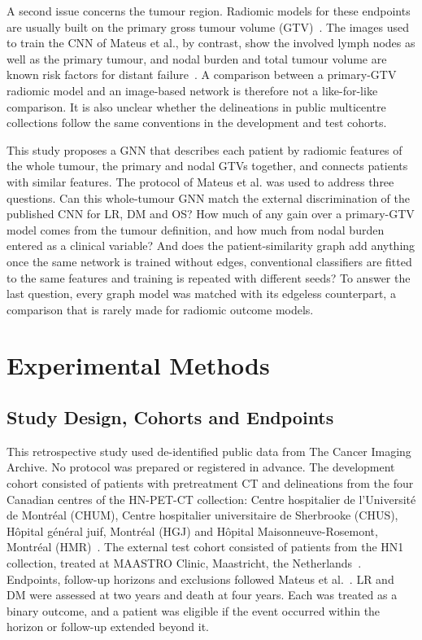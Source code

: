 \documentclass[pdflatex,iicol,sn-nature]{sn-jnl}
\begin{document}
A second issue concerns the tumour region. Radiomic models for these endpoints are usually built on the primary gross tumour volume (GTV)~\cite{aerts2014,vallieres2017}. The images used to train the CNN of Mateus et al., by contrast, show the involved lymph nodes as well as the primary tumour, and nodal burden and total tumour volume are known risk factors for distant failure~\cite{kjems2023volume,jensen2020nodalfdg}. A comparison between a primary-GTV radiomic model and an image-based network is therefore not a like-for-like comparison. It is also unclear whether the delineations in public multicentre collections follow the same conventions in the development and test cohorts.

This study proposes a GNN that describes each patient by radiomic features of the whole tumour, the primary and nodal GTVs together, and connects patients with similar features. The protocol of Mateus et al. was used to address three questions. Can this whole-tumour GNN match the external discrimination of the published CNN for LR, DM and OS? How much of any gain over a primary-GTV model comes from the tumour definition, and how much from nodal burden entered as a clinical variable? And does the patient-similarity graph add anything once the same network is trained without edges, conventional classifiers are fitted to the same features and training is repeated with different seeds? To answer the last question, every graph model was matched with its edgeless counterpart, a comparison that is rarely made for radiomic outcome models.

\section{Experimental Methods}\label{sec:methods}

\subsection{Study Design, Cohorts and Endpoints}\label{sec:design}
This retrospective study used de-identified public data from The Cancer Imaging Archive. No protocol was prepared or registered in advance. The development cohort consisted of \nPatCan{} patients with pretreatment CT and delineations from the four Canadian centres of the HN-PET-CT collection: Centre hospitalier de l'Universit\'e de Montr\'eal (CHUM), Centre hospitalier universitaire de Sherbrooke (CHUS), H\^opital g\'en\'eral juif, Montr\'eal (HGJ) and H\^opital Maisonneuve-Rosemont, Montr\'eal (HMR)~\cite{vallieres2017,vallieres2017tcia}. The external test cohort consisted of \nPatMAA{} patients from the HN1 collection, treated at MAASTRO Clinic, Maastricht, the Netherlands~\cite{aerts2014,wee2019hn1}. Endpoints, follow-up horizons and exclusions followed Mateus et al.~\cite{mateus2023}. LR and DM were assessed at two years and death at four years. Each was treated as a binary outcome, and a patient was eligible if the event occurred within the horizon or follow-up extended beyond it.
\end{document}
